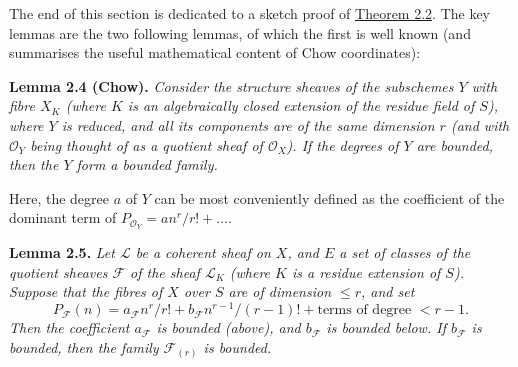 \documentclass{article}
\newenvironment{itenv}[1]
  {\phantomsection\par\smallskip\noindent\textbf{#1.}\itshape}
  {\par\smallskip}
\theoremstyle{definition}
\theoremstyle{definition}
\theoremstyle{definition}
\theoremstyle{definition}
\theoremstyle{remark}
\begin{document}
The end of this section is dedicated to a sketch proof of \protect\hyperlink{fga-3-iv-theorem-2.2}{Theorem 2.2}.
The key lemmas are the two following lemmas, of which the first is well known (and summarises the useful mathematical content of Chow coordinates):

\leavevmode{}%
\begin{itenv}{Lemma 2.4 (Chow)}
Consider the structure sheaves of the subschemes \(Y\) with fibre \(X_K\) (where \(K\) is an algebraically closed extension of the residue field of \(S\)), where \(Y\) is reduced, and all its components are of the same dimension \(r\) (and with \({\mathscr{O}}_Y\) being thought of as a quotient sheaf of \({\mathscr{O}}_X\)).
If the degrees of \(Y\) are bounded, then the \(Y\) form a bounded family.

\end{itenv}

Here, the degree \(a\) of \(Y\) can be most conveniently defined as the coefficient of the dominant term of \(P_{{\mathscr{O}}_Y}=an^r/r!+\ldots\).

\leavevmode{}%
\begin{itenv}{Lemma 2.5}
Let \({\mathscr{L}}\) be a coherent sheaf on \(X\), and \(E\) a set of classes of the quotient sheaves \({\mathscr{F}}\) of the sheaf \({\mathscr{L}}_K\) (where \(K\) is a residue extension of \(S\)).
Suppose that the fibres of \(X\) over \(S\) are of dimension \(\leqslant r\), and set
\[
  P_{\mathscr{F}}(n) = a_{\mathscr{F}}n^r/r! + b_{\mathscr{F}}n^{r-1}/(r-1)! + \text{terms of degree }<r-1.
\]
Then the coefficient \(a_{\mathscr{F}}\) is bounded (above), and \(b_{\mathscr{F}}\) is bounded below.
If \(b_{\mathscr{F}}\) is bounded, then the family \({\mathscr{F}}_{(r)}\) is bounded.

\end{itenv}
\end{document}
